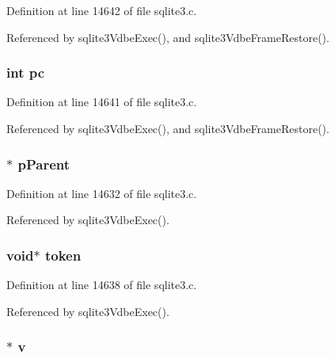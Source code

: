 Definition at line 14642 of file sqlite3.\+c.



Referenced by sqlite3\+Vdbe\+Exec(), and sqlite3\+Vdbe\+Frame\+Restore().

\hypertarget{struct_vdbe_frame_ac8c81e61335635fa4709d82412b31f06}{}
\subsubsection[{pc}]{\setlength{\rightskip}{0pt plus 5cm}int pc}\label{struct_vdbe_frame_ac8c81e61335635fa4709d82412b31f06}


Definition at line 14641 of file sqlite3.\+c.



Referenced by sqlite3\+Vdbe\+Exec(), and sqlite3\+Vdbe\+Frame\+Restore().

\hypertarget{struct_vdbe_frame_a6ede48174ab6d1a31e3ed0506f5bf467}{}
\subsubsection[{p\+Parent}]{$\ast$ p\+Parent}\label{struct_vdbe_frame_a6ede48174ab6d1a31e3ed0506f5bf467}


Definition at line 14632 of file sqlite3.\+c.



Referenced by sqlite3\+Vdbe\+Exec().

\hypertarget{struct_vdbe_frame_aa80a17db18ac71350fa401959c59e642}{}
\subsubsection[{token}]{\setlength{\rightskip}{0pt plus 5cm}void$\ast$ token}\label{struct_vdbe_frame_aa80a17db18ac71350fa401959c59e642}


Definition at line 14638 of file sqlite3.\+c.



Referenced by sqlite3\+Vdbe\+Exec().

\hypertarget{struct_vdbe_frame_a84655845ca6a8a0f807b442af4e7384b}{}
\subsubsection[{v}]{$\ast$ v}\label{struct_vdbe_frame_a84655845ca6a8a0f807b442af4e7384b}


